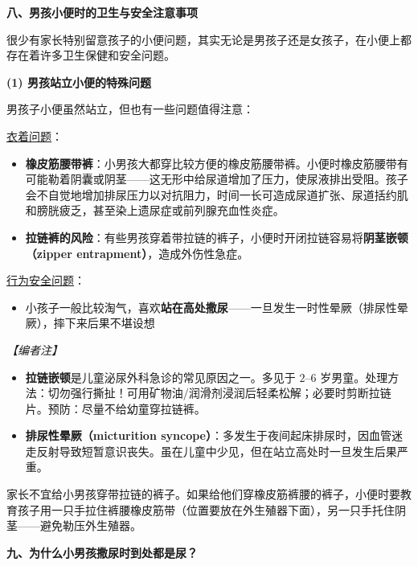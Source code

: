 \begin{enumerate}
\vspace{0.8em}
\noindent\textbf{八、男孩小便时的卫生与安全注意事项}

很少有家长特别留意孩子的小便问题，其实无论是男孩子还是女孩子，在小便上都存在着许多卫生保健和安全问题。

\vspace{0.5em}
\noindent\textbf{(1) 男孩站立小便的特殊问题}

男孩子小便虽然站立，但也有一些问题值得注意：

\underline{衣着问题}：
\begin{itemize}
	\item \textbf{橡皮筋腰带裤}：小男孩大都穿比较方便的橡皮筋腰带裤。小便时橡皮筋腰带有可能勒着阴囊或阴茎——这无形中给尿道增加了压力，使尿液排出受阻。孩子会不自觉地增加排尿压力以对抗阻力，时间一长可造成尿道扩张、尿道括约肌和膀胱疲乏，甚至染上遗尿症或前列腺充血性炎症。
	\item \textbf{拉链裤的风险}：有些男孩穿着带拉链的裤子，小便时开闭拉链容易将\textbf{阴茎嵌顿（zipper entrapment）}，造成外伤性急症。
\end{itemize}

\underline{行为安全问题}：
\begin{itemize}
	\item 小孩子一般比较淘气，喜欢\textbf{站在高处撒尿}——一旦发生一时性晕厥（排尿性晕厥），摔下来后果不堪设想
\end{itemize}

\vspace{0.3em}
\noindent\textit{【编者注】}
\begin{itemize}
	\item \textbf{拉链嵌顿}是儿童泌尿外科急诊的常见原因之一。多见于 $2$--$6$ 岁男童。处理方法：切勿强行撕扯！可用矿物油/润滑剂浸润后轻柔松解；必要时剪断拉链片。预防：尽量不给幼童穿拉链裤。
	\item \textbf{排尿性晕厥（micturition syncope）}：多发生于夜间起床排尿时，因血管迷走反射导致短暂意识丧失。虽在儿童中少见，但在站立高处时一旦发生后果严重。
\end{itemize}

\begin{tcolorbox}[colback=pink!5!white,colframe=red!50!black,title=贴心小叮咛]
家长不宜给小男孩穿带拉链的裤子。如果给他们穿橡皮筋裤腰的裤子，小便时要教育孩子用一只手拉住裤腰橡皮筋带（位置要放在外生殖器下面），另一只手托住阴茎——避免勒压外生殖器。
\end{tcolorbox}

\vspace{0.8em}
\noindent\textbf{九、为什么小男孩撒尿时到处都是尿？}


\end{enumerate}
